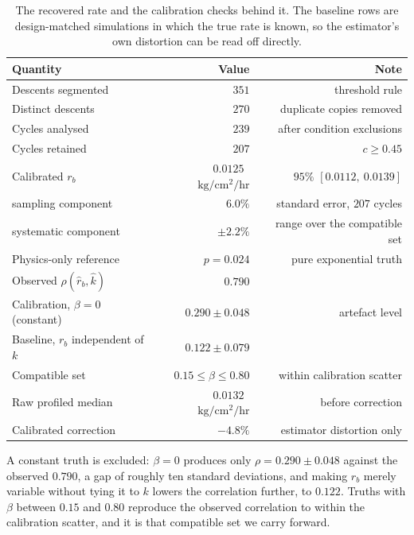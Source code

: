 \documentclass[runningheads]{llncs}
\newcommand{\ratu}{\ensuremath{\mathrm{kg/cm^{2}/hr}}}
\newcommand{\rb}{\ensuremath{r_{b}}}
\newcommand{\rbh}{\ensuremath{\hat{r}_{b}}}
\newcommand{\kh}{\ensuremath{\hat{k}}}
\begin{document}
\begin{table}[t]
\caption{The recovered rate and the calibration checks behind it. The
baseline rows are design-matched simulations in which the true rate is
known, so the estimator's own distortion can be read off directly.}
\label{tab:rate}
\centering
\begin{tabular}{lrr}
\toprule
Quantity & Value & Note \\
\midrule
Descents segmented & $351$ & threshold rule \\
Distinct descents & $270$ & duplicate copies removed \\
Cycles analysed & $239$ & after condition exclusions \\
Cycles retained & $207$ & $c \ge 0.45$ \\
Calibrated \rb{} & $0.0125$~\ratu{} & $95\%$ $[0.0112,\ 0.0139]$ \\
\quad sampling component & $6.0\%$ & standard error, $207$ cycles \\
\quad systematic component & $\pm 2.2\%$ & range over the compatible set \\
Physics-only reference & $p=0.024$ & pure exponential truth \\
\midrule
Observed $\rho(\rbh,\kh)$ & $0.790$ & \\
Calibration, $\beta=0$ (constant) & $0.290 \pm 0.048$ & artefact level \\
Baseline, \rb{} independent of $k$ & $0.122 \pm 0.079$ & \\
Compatible set & $0.15 \le \beta \le 0.80$ & within calibration scatter \\
\midrule
Raw profiled median & $0.0132$~\ratu{} & before correction \\
Calibrated correction & $-4.8\%$ & estimator distortion only \\
\bottomrule
\end{tabular}
\end{table}

A constant truth is excluded: $\beta=0$ produces only
$\rho=0.290 \pm 0.048$ against the observed $0.790$, a gap of roughly
ten standard deviations, and making \rb{} merely variable without
tying it to $k$ lowers the correlation further, to $0.122$. Truths
with $\beta$ between $0.15$ and $0.80$ reproduce the observed
correlation to within the calibration scatter, and it is that
compatible set we carry forward.
\end{document}
